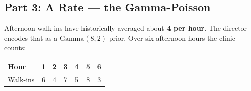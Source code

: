 \documentclass{article}
\begin{document}
\subsection*{Part 3: A Rate --- the Gamma-Poisson}

Afternoon walk-ins have historically averaged about \textbf{4 per hour}. The director encodes that as a $\text{Gamma}(8, 2)$ prior. Over six afternoon hours the clinic counts:

\begin{center}
\renewcommand{\arraystretch}{1.2}
\begin{tabular}{lcccccc}
\toprule
Hour & 1 & 2 & 3 & 4 & 5 & 6 \\
\midrule
Walk-ins & 6 & 4 & 7 & 5 & 8 & 3 \\
\bottomrule
\end{tabular}
\end{center}
\end{document}

